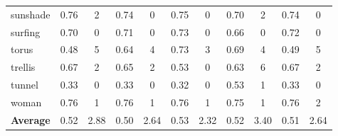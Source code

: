 \begin{table}
\begin{center}
\begin{tabular}{l c c c c c c c c c c}
sunshade & 0.76 & 2 & 0.74 & 0 & 0.75 & 0 & 0.70 & 2 & 0.74 & 0\\
surfing & 0.70 & 0 & 0.71 & 0 & 0.73 & 0 & 0.66 & 0 & 0.72 & 0\\
torus & 0.48 & 5 & 0.64 & 4 & 0.73 & 3 & 0.69 & 4 & 0.49 & 5\\
trellis & 0.67 & 2 & 0.65 & 2 & 0.53 & 0 & 0.63 & 6 & 0.67 & 2\\
tunnel & 0.33 & 0 & 0.33 & 0 & 0.32 & 0 & 0.53 & 1 & 0.33 & 0\\
woman & 0.76 & 1 & 0.76 & 1 & 0.76 & 1 & 0.75 & 1 & 0.76 & 2\\
\hline 
{\bf Average} & 0.52 & 2.88 & 0.50 & 2.64 & 0.53 & 2.32 & 0.52 & 3.40 & 0.51 & 2.64\\
\hline 
\end{tabular}
\end{center}
\end{table}
